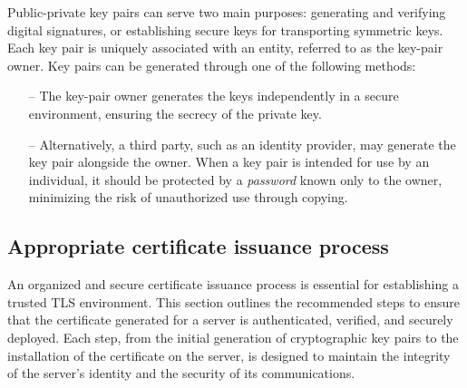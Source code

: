 \documentclass[pdflatex,sn-mathphys-num]{sn-jnl}%
\theoremstyle{thmstyleone}%
\theoremstyle{thmstyletwo}%
\theoremstyle{thmstylethree}%
\begin{document}
Public-private key pairs can serve two main purposes: generating and verifying digital signatures, or establishing secure keys for transporting symmetric keys. Each key pair is uniquely associated with an entity, referred to as the key-pair owner. Key pairs can be generated through one of the following methods:

\begin{itemize}
     \item[--] The key-pair owner generates the keys independently in a secure environment, ensuring the secrecy of the private key.
    

     \item[--] Alternatively, a third party, such as an identity provider, may generate the key pair alongside the owner. When a key pair is intended for use by an individual, it should be protected by a \textit{password} known only to the owner, minimizing the risk of unauthorized use through copying.


\end{itemize}

\subsection{Appropriate certificate issuance process}

An organized and secure certificate issuance process is essential for establishing a trusted TLS environment. This section outlines the recommended steps to ensure that the certificate generated for a server is authenticated, verified, and securely deployed. Each step, from the initial generation of cryptographic key pairs to the installation of the certificate on the server, is designed to maintain the integrity of the server's identity and the security of its communications.
\end{document}
